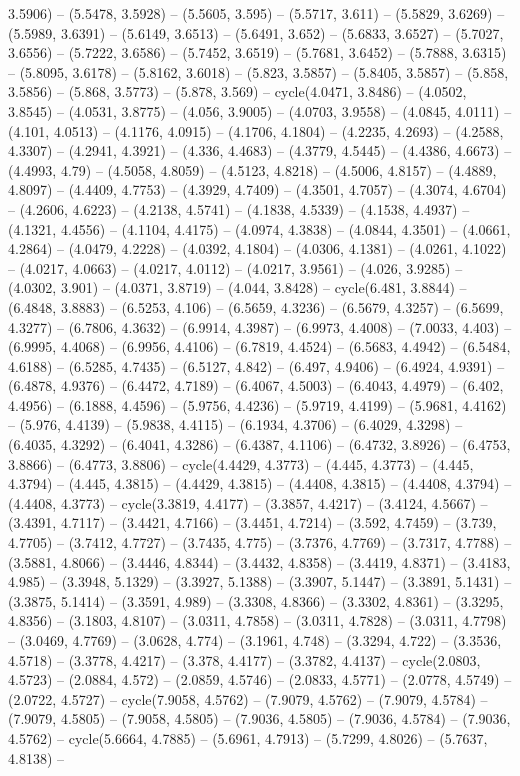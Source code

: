 3.5906) -- (5.5478, 3.5928) -- (5.5605, 3.595) -- (5.5717, 3.611) -- (5.5829, 3.6269) -- (5.5989, 3.6391) -- (5.6149, 3.6513) -- (5.6491, 3.652) -- (5.6833, 3.6527) -- (5.7027, 3.6556) -- (5.7222, 3.6586) -- (5.7452, 3.6519) -- (5.7681, 3.6452) -- (5.7888, 3.6315) -- (5.8095, 3.6178) -- (5.8162, 3.6018) -- (5.823, 3.5857) -- (5.8405, 3.5857) -- (5.858, 3.5856) -- (5.868, 3.5773) -- (5.878, 3.569) -- cycle(4.0471, 3.8486) -- (4.0502, 3.8545) -- (4.0531, 3.8775) -- (4.056, 3.9005) -- (4.0703, 3.9558) -- (4.0845, 4.0111) -- (4.101, 4.0513) -- (4.1176, 4.0915) -- (4.1706, 4.1804) -- (4.2235, 4.2693) -- (4.2588, 4.3307) -- (4.2941, 4.3921) -- (4.336, 4.4683) -- (4.3779, 4.5445) -- (4.4386, 4.6673) -- (4.4993, 4.79) -- (4.5058, 4.8059) -- (4.5123, 4.8218) -- (4.5006, 4.8157) -- (4.4889, 4.8097) -- (4.4409, 4.7753) -- (4.3929, 4.7409) -- (4.3501, 4.7057) -- (4.3074, 4.6704) -- (4.2606, 4.6223) -- (4.2138, 4.5741) -- (4.1838, 4.5339) -- (4.1538, 4.4937) -- (4.1321, 4.4556) -- (4.1104, 4.4175) -- (4.0974, 4.3838) -- (4.0844, 4.3501) -- (4.0661, 4.2864) -- (4.0479, 4.2228) -- (4.0392, 4.1804) -- (4.0306, 4.1381) -- (4.0261, 4.1022) -- (4.0217, 4.0663) -- (4.0217, 4.0112) -- (4.0217, 3.9561) -- (4.026, 3.9285) -- (4.0302, 3.901) -- (4.0371, 3.8719) -- (4.044, 3.8428) -- cycle(6.481, 3.8844) -- (6.4848, 3.8883) -- (6.5253, 4.106) -- (6.5659, 4.3236) -- (6.5679, 4.3257) -- (6.5699, 4.3277) -- (6.7806, 4.3632) -- (6.9914, 4.3987) -- (6.9973, 4.4008) -- (7.0033, 4.403) -- (6.9995, 4.4068) -- (6.9956, 4.4106) -- (6.7819, 4.4524) -- (6.5683, 4.4942) -- (6.5484, 4.6188) -- (6.5285, 4.7435) -- (6.5127, 4.842) -- (6.497, 4.9406) -- (6.4924, 4.9391) -- (6.4878, 4.9376) -- (6.4472, 4.7189) -- (6.4067, 4.5003) -- (6.4043, 4.4979) -- (6.402, 4.4956) -- (6.1888, 4.4596) -- (5.9756, 4.4236) -- (5.9719, 4.4199) -- (5.9681, 4.4162) -- (5.976, 4.4139) -- (5.9838, 4.4115) -- (6.1934, 4.3706) -- (6.4029, 4.3298) -- (6.4035, 4.3292) -- (6.4041, 4.3286) -- (6.4387, 4.1106) -- (6.4732, 3.8926) -- (6.4753, 3.8866) -- (6.4773, 3.8806) -- cycle(4.4429, 4.3773) -- (4.445, 4.3773) -- (4.445, 4.3794) -- (4.445, 4.3815) -- (4.4429, 4.3815) -- (4.4408, 4.3815) -- (4.4408, 4.3794) -- (4.4408, 4.3773) -- cycle(3.3819, 4.4177) -- (3.3857, 4.4217) -- (3.4124, 4.5667) -- (3.4391, 4.7117) -- (3.4421, 4.7166) -- (3.4451, 4.7214) -- (3.592, 4.7459) -- (3.739, 4.7705) -- (3.7412, 4.7727) -- (3.7435, 4.775) -- (3.7376, 4.7769) -- (3.7317, 4.7788) -- (3.5881, 4.8066) -- (3.4446, 4.8344) -- (3.4432, 4.8358) -- (3.4419, 4.8371) -- (3.4183, 4.985) -- (3.3948, 5.1329) -- (3.3927, 5.1388) -- (3.3907, 5.1447) -- (3.3891, 5.1431) -- (3.3875, 5.1414) -- (3.3591, 4.989) -- (3.3308, 4.8366) -- (3.3302, 4.8361) -- (3.3295, 4.8356) -- (3.1803, 4.8107) -- (3.0311, 4.7858) -- (3.0311, 4.7828) -- (3.0311, 4.7798) -- (3.0469, 4.7769) -- (3.0628, 4.774) -- (3.1961, 4.748) -- (3.3294, 4.722) -- (3.3536, 4.5718) -- (3.3778, 4.4217) -- (3.378, 4.4177) -- (3.3782, 4.4137) -- cycle(2.0803, 4.5723) -- (2.0884, 4.572) -- (2.0859, 4.5746) -- (2.0833, 4.5771) -- (2.0778, 4.5749) -- (2.0722, 4.5727) -- cycle(7.9058, 4.5762) -- (7.9079, 4.5762) -- (7.9079, 4.5784) -- (7.9079, 4.5805) -- (7.9058, 4.5805) -- (7.9036, 4.5805) -- (7.9036, 4.5784) -- (7.9036, 4.5762) -- cycle(5.6664, 4.7885) -- (5.6961, 4.7913) -- (5.7299, 4.8026) -- (5.7637, 4.8138) -- 